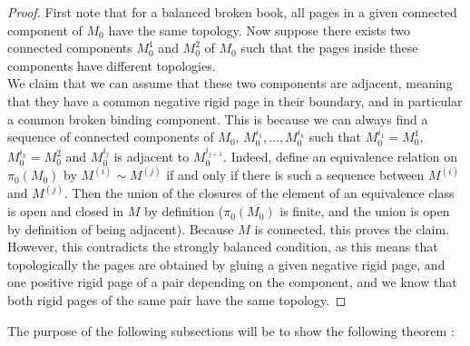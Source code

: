 \documentclass[../main.tex]{subfiles}
\begin{document}
\begin{proof}
First note that for a balanced broken book, all pages in a given connected component of $M_0$ have the same topology. Now suppose there exists two connected components $M_0^1$ and $M_0^2$ of $M_0$ such that the pages inside these components have different topologies. \\

We claim that we can assume that these two components are adjacent, meaning that they have a common negative rigid page in their boundary, and in particular a common broken binding component. This is because we can always find a sequence of connected components of $M_0$, $M_0^{i_1},...,M_0^{i_k}$ such that $M_0^{i_1} = M_0^1$, $M_0^{i_k} = M_0^2$ and $M_0^{i_j}$ is adjacent to $M_0^{i_{j+1}}$. Indeed, define an equivalence relation on $\pi_0(M_0)$ by $M^{(i)}\sim M^{(j)}$ if and only if there is such a sequence between $M^{(i)}$ and $M^{(j)}$. Then the union of the closures of the element of an equivalence class is open and closed in $M$ by definition ($\pi_0(M_0)$ is finite, and the union is open by definition of being adjacent). Because $M$ is connected, this proves the claim.\\

However, this contradicts the strongly balanced condition, as this means that topologically the pages are obtained by gluing a given negative rigid page, and one positive rigid page of a pair depending on the component, and we know that both rigid pages of the same pair have the same topology.
\end{proof}



The purpose of the following subsections will be to show the following theorem :
\end{document}
